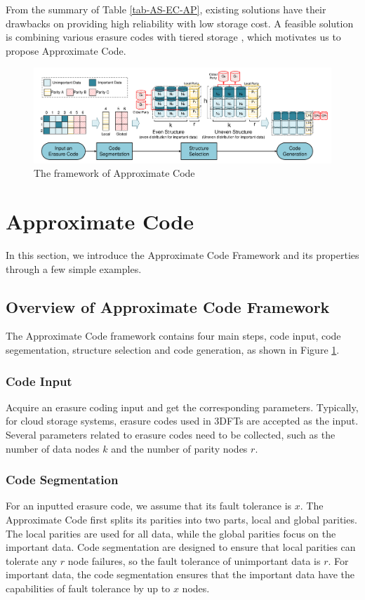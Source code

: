 \documentclass[sigconf]{acmart}
\begin{document}
From the summary of Table \ref{tab-AS-EC-AP}, existing solutions have their drawbacks on providing high reliability with low storage cost. 
A feasible solution is combining various erasure codes with tiered storage \cite{krish2014hats} \cite{wang2014balancing} \cite{zhang2010automated} \cite{udipi2012lot}, which motivates us to propose Approximate Code.

\begin{figure}[ht!]
\centering
\includegraphics[width=0.95\linewidth]{photo/Framework-v3.pdf}
\caption{The framework of Approximate Code}
\label{fig-framework}
\end{figure}

\section{Approximate Code}\label{ApCode}
In this section, we introduce the Approximate Code Framework and its properties through a few simple examples.

\subsection{Overview of Approximate Code Framework}
The Approximate Code framework contains four main steps, code input, code segementation, structure selection and code generation, as shown in Figure \ref{fig-framework}.

\subsubsection{Code Input}
Acquire an erasure coding input and get the corresponding parameters. Typically, for cloud storage systems, erasure codes used in 3DFTs are accepted as the input. Several parameters related to erasure codes need to be collected, such as the number of data nodes $k$ and the number of parity nodes $r$.

\subsubsection{Code Segmentation}
For an inputted erasure code, we assume that its fault tolerance is $x$. The Approximate Code first splits its parities into two parts, local and global parities. The local parities are used for all data, while the global parities focus on the important data. Code segmentation are designed to ensure that local parities can tolerate any $r$ node failures, so the fault tolerance of unimportant data is $r$. For important data, the code segmentation ensures that the important data have the capabilities of fault tolerance by up to $x$ nodes.
\end{document}
